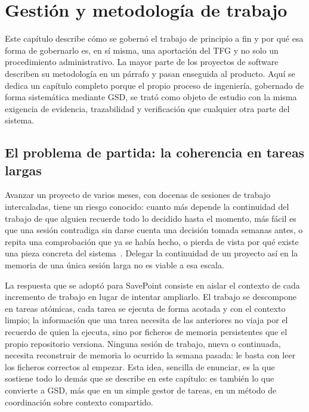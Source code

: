 \chapter{Gestión y metodología de trabajo}\label{cap:gestion}

Este capítulo describe cómo se gobernó el trabajo de principio a fin y por qué esa forma de
gobernarlo es, en sí misma, una aportación del TFG y no solo un procedimiento administrativo.
La mayor parte de los proyectos de software describen su metodología en un párrafo y pasan
enseguida al producto. Aquí se dedica un capítulo completo porque el propio proceso de
ingeniería, gobernado de forma sistemática mediante GSD, se trató como objeto de estudio con
la misma exigencia de evidencia, trazabilidad y verificación que cualquier otra parte del
sistema.

\section{El problema de partida: la coherencia en tareas largas}\label{sec:gestion-problema}

Avanzar un proyecto de varios meses, con docenas de sesiones de trabajo intercaladas, tiene un
riesgo conocido: cuanto más depende la continuidad del trabajo de que alguien recuerde todo lo
decidido hasta el momento, más fácil es que una sesión contradiga sin darse cuenta una decisión
tomada semanas antes, o repita una comprobación que ya se había hecho, o pierda de vista por
qué existe una pieza concreta del sistema~\cite{anthropic-context}. Delegar la continuidad de
un proyecto así en la memoria de una única sesión larga no es viable a esa escala.

La respuesta que se adoptó para SavePoint consiste en aislar el contexto de cada incremento de
trabajo en lugar de intentar ampliarlo. El trabajo se descompone en tareas atómicas, cada tarea
se ejecuta de forma acotada y con el contexto limpio; la información que una tarea necesita de
las anteriores no viaja por el recuerdo de quien la ejecuta, sino por ficheros de memoria
persistentes que el propio repositorio versiona. Ninguna sesión de trabajo, nueva o continuada,
necesita reconstruir de memoria lo ocurrido la semana pasada: le basta con leer los ficheros
correctos al empezar. Esta idea, sencilla de enunciar, es la que sostiene todo lo demás que se
describe en este capítulo: es también lo que convierte a GSD, más que en un simple gestor de
tareas, en un método de coordinación sobre contexto compartido.

